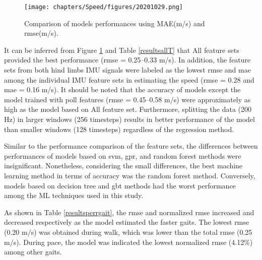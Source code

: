 \begin{figure}[htbp]
\centering
\texttt{[image: chapters/Speed/figures/20201029.png]}
\caption{Comparison of models performances using MAE(m/s) and \gls{rmse}(m/s).}
\label{resultsallF}
\end{figure}

 It can be inferred from Figure \ref{resultsallF} and Table \ref{resultsallT} that All feature sets provided the best performance (\gls{rmse} = 0.25--0.33 m/s). In addition, the feature sets from both hind limbs IMU signals were labeled as the lowest \gls{rmse} and \gls{mae} among the individual IMU feature sets in estimating the speed (\gls{rmse} = 0.28 and \gls{mae} = 0.16 m/s). It should be noted that the accuracy of models except the model trained with poll features (\gls{rmse} = 0.45--0.58 m/s) were approximately as high as the model based on All feature set. Furthermore, splitting the data (200 Hz) in larger windows (256 timesteps) results in better performance of the model than smaller windows (128 timesteps) regardless of the regression method.

Similar to the performance comparison of the feature sets, the differences between performances of models based on \gls{svm}, \gls{gpr}, and random forest methods were insignificant. Nonetheless, considering the small differences, the best machine learning method in terms of accuracy was the random forest method. Conversely, models based on decision tree and \gls{gbt} methods had the worst performance among the ML techniques used in this study.

As shown in Table \ref{resultsperrgait}, the \gls{rmse} and normalized \gls{rmse} increased and decreased respectively as the model estimated the faster gaits. The lowest \gls{rmse} (0.20 m/s) was obtained during walk, which was lower than the total \gls{rmse} (0.25 m/s). During pace, the model was indicated the lowest normalized \gls{rmse} (4.12\%) among other gaits.

